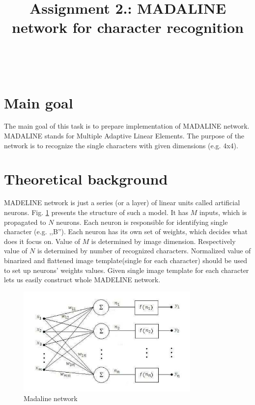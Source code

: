 \documentclass{classrep}
\author{%
    \studentinfo[239671@edu.p.lodz.pl]{Jan Karwowski}{239671}\\
    \studentinfo[239676@edu.p.lodz.pl]{Kamil Kowalewski}{239676}\\
}
\title{Assignment 2.: MADALINE network for character recognition}
\begin{document}
    \maketitle
    \thispagestyle{fancyplain}

    \tableofcontents
    \newpage

    \section{Main goal}
    \label{main_goal} {
        The main goal of this task is to prepare implementation of MADALINE network.
        MADALINE stands for Multiple Adaptive Linear Elements. The purpose of the
        network is to recognize the single characters with given dimensions (e.g. 4x4).
    }

    \section{Theoretical background}
    \label{theory} {
        MADELINE network is just a series (or a layer) of linear units called
        artificial neurons. Fig. \ref{fig:madeline} presents the structure of such a
        model. It has $M$ inputs, which is propagated to $N$ neurons. Each neuron is
        responsible for identifying single character (e.g. ,,B''). Each neuron has its
        own set of weights, which decides what does it focus on. Value
        of $M$ is determined by image dimension. Respectively value of $N$ is
        determined by number of recognized characters. Normalized value of binarized
        and flattened image template(single for each character) should be used to set
        up neurons' weights values. Given single image template for each character lets
        us easily construct whole MADELINE network.

        \begin{figure}[!htbp]
            \centering
            \includegraphics[width=0.8\textwidth]{img/madeline.jpg}
            \caption{Madaline network}
            \label{fig:madeline}
        \end{figure}
        \FloatBarrier
    }
\end{document}
